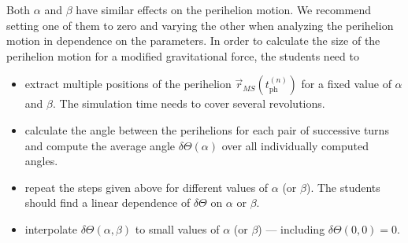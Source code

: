 \documentclass[12pt,ngerman,american]{iopart}
\begin{document}
Both $\alpha$ and $\beta$ have similar effects on the perihelion motion.
We recommend setting one of them to zero and varying the other when analyzing the perihelion motion in dependence on the parameters.
In order to calculate the size of the perihelion motion for a modified gravitational force, the students need to
\begin{itemize}
\item extract multiple positions of the perihelion $\vec r_{MS} ( t_\mathrm{ph}^{(n)} )$ for a fixed value of $\alpha$ and $\beta$. The  simulation time needs to cover several revolutions.
\item calculate the angle between the perihelions for each pair of successive turns and compute the average angle $\delta \Theta (\alpha)$ over all individually computed angles.
\item repeat the steps given above for different values of $\alpha$ (or $\beta$). The students should find a linear dependence of $\delta \Theta$ on $\alpha$ or $\beta$.
\item interpolate $\delta \Theta (\alpha, \beta)$ to small values of $\alpha$ (or $\beta$) --- including  $\delta \Theta(0,0)=0$.
\end{itemize}
\end{document}
